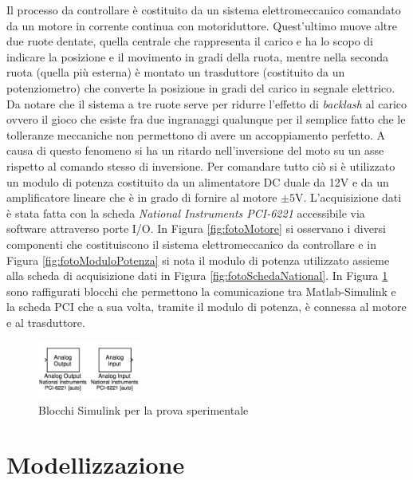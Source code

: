 \documentclass[english]{article}
\begin{document}
	\noindent Il processo da controllare è costituito da un sistema elettromeccanico comandato da un motore in corrente continua con motoriduttore. Quest'ultimo muove altre due ruote dentate, quella centrale che rappresenta il carico e ha lo scopo di indicare la posizione e il movimento in gradi della ruota, mentre nella seconda ruota (quella più esterna) è montato un trasduttore (costituito da un potenziometro) che converte la posizione in gradi del carico in segnale elettrico. Da notare che il sistema a tre ruote serve per ridurre l'effetto di \textit{backlash} al carico ovvero il gioco che esiste fra due ingranaggi qualunque per il semplice fatto che le tolleranze meccaniche non permettono di avere un accoppiamento perfetto. A causa di questo fenomeno si ha un ritardo nell'inversione del moto su un asse rispetto al comando stesso di inversione. Per comandare tutto ciò si è utilizzato un modulo di potenza costituito da un alimentatore DC duale da 12V e da un amplificatore lineare che è in grado di fornire al motore $\pm 5$V. L'acquisizione dati è stata fatta con la scheda \textit{National Instruments PCI-6221} accessibile via software attraverso porte I/O. In Figura \ref{fig:fotoMotore} si osservano i diversi componenti che costituiscono il sistema elettromeccanico da controllare e in Figura \ref{fig:fotoModuloPotenza} si nota il modulo di potenza utilizzato assieme alla scheda di acquisizione dati in Figura \ref{fig:fotoSchedaNational}. In Figura \ref{fig:blocchiSimulink} sono raffigurati blocchi che permettono la comunicazione tra Matlab-Simulink e la scheda PCI che a sua volta, tramite il modulo di potenza, è connessa al motore e al trasduttore.
	
	\begin{figure}[!h]
		\centering
		\includegraphics[width=0.3\textwidth]{./figure/blocchi_simulink}
		\caption{Blocchi Simulink per la prova sperimentale}
		\label{fig:blocchiSimulink}
	\end{figure}
	
	
	
	
	
	
	
	
\newpage
\section{Modellizzazione}
\label{sec:Modelizzazione}
	
\end{document}
